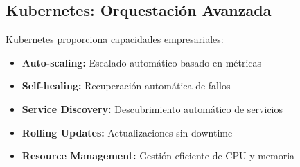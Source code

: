 \documentclass[12pt,a4paper]{article}
\begin{document}
\subsection{Kubernetes: Orquestación Avanzada}
Kubernetes proporciona capacidades empresariales:
\begin{itemize}
    \item \textbf{Auto-scaling:} Escalado automático basado en métricas
    \item \textbf{Self-healing:} Recuperación automática de fallos
    \item \textbf{Service Discovery:} Descubrimiento automático de servicios
    \item \textbf{Rolling Updates:} Actualizaciones sin downtime
    \item \textbf{Resource Management:} Gestión eficiente de CPU y memoria
\end{itemize}
\end{document}
